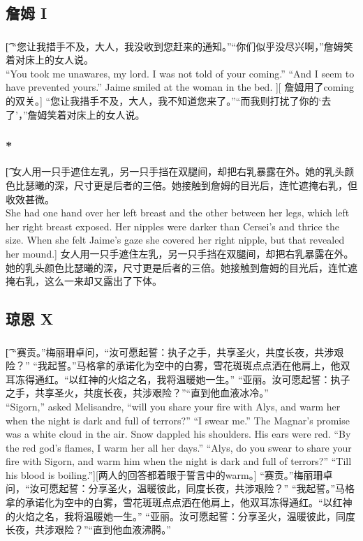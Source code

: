 \documentclass[12pt,a4paper]{article}
\begin{document}
\subsection{詹姆 I}
\subsubsection{}\t[
	“您让我措手不及，大人，我没收到您赶来的通知。”“你们似乎没尽兴啊，”詹姆笑着对床上的女人说。\\
	“You took me unawares, my lord. I was not told of your coming.”
	“And I seem to have prevented yours.” Jaime smiled at the woman in the bed. ][
	詹姆用了coming的双关。]
	“您让我措手不及，大人，我不知道您来了。”“而我则打扰了你的‘去了’，”詹姆笑着对床上的女人说。

\subsubsection{\color{red}*}\t[
	女人用一只手遮住左乳，另一只手挡在双腿间，却把右乳暴露在外。她的乳头颜色比瑟曦的深，尺寸更是后者的三倍。她接触到詹姆的目光后，连忙遮掩右乳，但收效甚微。\\
	She had one hand over her left breast and the other between her legs, which left her right breast exposed. Her nipples were darker than Cersei's and thrice the size. When she felt Jaime's gaze she covered her right nipple, but that revealed her mound.]
	女人用一只手遮住左乳，另一只手挡在双腿间，却把右乳暴露在外。她的乳头颜色比瑟曦的深，尺寸更是后者的三倍。她接触到詹姆的目光后，连忙遮掩右乳，这么一来却又露出了下体。
	
\subsection{琼恩 X}
\subsubsection{}\t[
	“赛贡。”梅丽珊卓问，“汝可愿起誓：执子之手，共享圣火，共度长夜，共涉艰险？”
	“我起誓。”马格拿的承诺化为空中的白雾，雪花斑斑点点洒在他肩上，他双耳冻得通红。“以红神的火焰之名，我将温暖她一生。”
	“亚丽。汝可愿起誓：执子之手，共享圣火，共度长夜，共涉艰险？”“直到他血液冰冷。”\\
	“Sigorn,” asked Melisandre, “will you share your fire with Alys, and warm her when the night is dark and full of terrors?”
	“I swear me.” The Magnar's promise was a white cloud in the air. Snow dappled his shoulders. His ears were red. “By the red god's flames, I warm her all her days.”
	“Alys, do you swear to share your fire with Sigorn, and warm him when the night is dark and full of terrors?”
	“Till his blood is boiling.”][两人的回答都着眼于誓言中的warm。]
	“赛贡。”梅丽珊卓问，“汝可愿起誓：分享圣火，温暖彼此，同度长夜，共涉艰险？”
	“我起誓。”马格拿的承诺化为空中的白雾，雪花斑斑点点洒在他肩上，他双耳冻得通红。“以红神的火焰之名，我将温暖她一生。”
	“亚丽。汝可愿起誓：分享圣火，温暖彼此，同度长夜，共涉艰险？”“直到他血液沸腾。”
	
\end{document}
